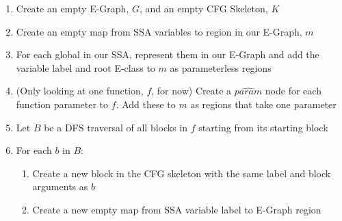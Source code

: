 \documentclass{article}
\begin{document}
\begin{enumerate}
  \item Create an empty E-Graph, $G$, and an empty CFG Skeleton, $K$

  \item Create an empty map from SSA variables to region in our E-Graph, $m$

  \item For each global in our SSA, represent them in our E-Graph and add the variable label and root E-class to $m$ as parameterless regions

  \item (Only looking at one function, $f$, for now) Create a $\hat{param}$ node for each function parameter to $f$. Add these to $m$ as regions that take one parameter

  \item Let $B$ be a DFS traversal of all blocks in $f$ starting from its starting block

  \item For each $b$ in $B$:

    \begin{enumerate}
      \item Create a new block in the CFG skeleton with the same label and block arguments as $b$

      \item Create a new empty map from SSA variable label to E-Graph region

    \end{enumerate}
\end{enumerate}
\end{document}
